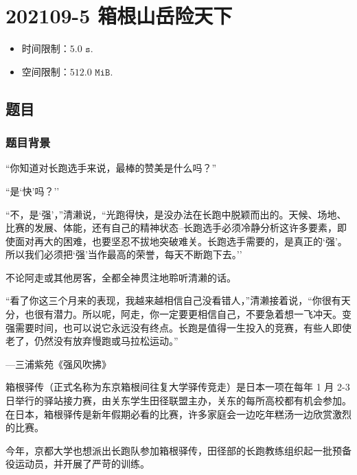 \section{202109-5 箱根山岳险天下}
	\begin{itemize}
		\item 时间限制：$5.0\texttt{ s}$.
		\item 空间限制：$512.0\texttt{ MiB}$.
	\end{itemize}
	\subsection{题目}
		\subsubsection{题目背景}
			\par ``你知道对长跑选手来说，最棒的赞美是什么吗？''
			\par ``是`快'吗？''
			\par ``不，是`强'，''清濑说，``光跑得快，是没办法在长跑中脱颖而出的。天候、场地、比赛的发展、体能，还有自己的精神状态--长跑选手必须冷静分析这许多要素，即使面对再大的困难，也要坚忍不拔地突破难关。长跑选手需要的，是真正的`强'。所以我们必须把`强'当作最高的荣誉，每天不断跑下去。''
			\par 不论阿走或其他房客，全都全神贯注地聆听清濑的话。
			\par ``看了你这三个月来的表现，我越来越相信自己没看错人，''清濑接着说，``你很有天分，也很有潜力。所以呢，阿走，你一定要更相信自己，不要急着想一飞冲天。变强需要时间，也可以说它永远没有终点。长跑是值得一生投入的竞赛，有些人即使老了，仍然没有放弃慢跑或马拉松运动。''
			\par ---三浦紫苑《强风吹拂》
			\par 箱根驿传（正式名称为东京箱根间往复大学驿传竞走）是日本一项在每年 1 月 2-3 日举行的驿站接力赛，由关东学生田径联盟主办，关东的每所高校都有机会参加。在日本，箱根驿传是新年假期必看的比赛，许多家庭会一边吃年糕汤一边欣赏激烈的比赛。
			\par 今年，京都大学也想派出长跑队参加箱根驿传，田径部的长跑教练组织起一批预备役运动员，并开展了严苛的训练。
